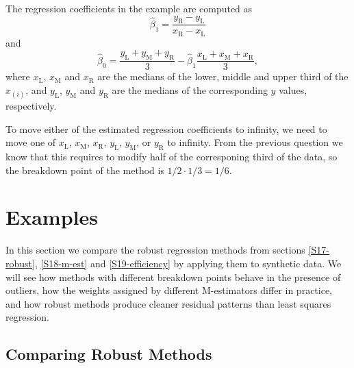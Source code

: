 \documentclass[
  a4paper,
]{article}
\theoremstyle{definition}
\theoremstyle{definition}
\theoremstyle{definition}
\theoremstyle{definition}
\theoremstyle{remark}
\begin{document}
\begin{myanswers}
The regression coefficients in the example are computed
as
\begin{equation*}
  \hat\beta_1
  = \frac{y_\mathrm{R} - y_\mathrm{L}}{x_\mathrm{R} - x_\mathrm{L}}
\end{equation*}
and
\begin{equation*}
  \hat\beta_0
  = \frac{y_\mathrm{L} + y_\mathrm{M} + y_\mathrm{R}}{3}
      - \hat\beta_1 \frac{x_\mathrm{L} + x_\mathrm{M} + x_\mathrm{R}}{3},
\end{equation*}
where
\(x_\mathrm{L}\), \(x_\mathrm{M}\) and \(x_\mathrm{R}\)
are the medians of the lower, middle and upper third of the \(x_{(i)}\),
and \(y_\mathrm{L}\), \(y_\mathrm{M}\) and \(y_\mathrm{R}\) are the medians
of the corresponding \(y\) values, respectively.

To move either of the estimated regression coefficients to infinity,
we need to move one of \(x_\mathrm{L}\), \(x_\mathrm{M}\), \(x_\mathrm{R}\),
\(y_\mathrm{L}\), \(y_\mathrm{M}\), or \(y_\mathrm{R}\) to infinity.
From the previous question we know that this requires to modify
half of the corresponing third of the data, so the breakdown point
of the method is \(1/2 \cdot 1/3 = 1/6\).

\end{myanswers}

\clearpage

\section{Examples}\label{S20-examples}

In this section we compare the robust regression methods from sections
\ref{S17-robust}, \ref{S18-m-est} and \ref{S19-efficiency} by applying
them to synthetic data. We will see how methods with different breakdown
points behave in the presence of outliers, how the weights assigned by
different M-estimators differ in practice, and how robust methods produce
cleaner residual patterns than least squares regression.

\subsection{Comparing Robust Methods}\label{comparing-robust-methods}
\end{document}
